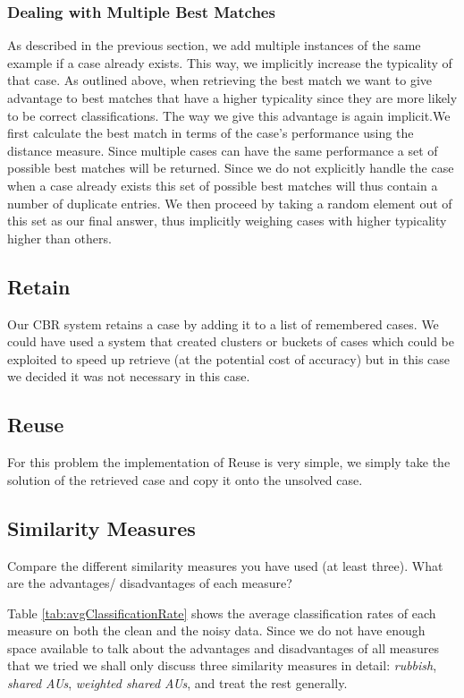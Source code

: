 \documentclass[10pt,a4paper]{article}
\begin{document}
\subsubsection{Dealing with Multiple Best Matches}
As described in the previous section, we add multiple instances of the same example if a case already exists. This way, we implicitly increase the typicality of that case. As outlined above, when retrieving the best match we want to give advantage to best matches that have a higher typicality since they are more likely to be correct classifications. The way we give this advantage is again implicit.We first calculate the best match in terms of the case's performance using the distance measure. Since multiple cases can have the same performance a set of possible best matches will be returned. Since we do not explicitly handle the case when a case already exists this set of possible best matches will thus contain a number of duplicate entries. We then proceed by taking a random element out of this set as our final answer, thus implicitly weighing cases with higher typicality higher than others.

\subsection{Retain}
Our CBR system retains a case by adding it to a list of remembered cases.
We could have used a system that created clusters or buckets of cases which could be exploited to speed up retrieve (at the potential cost of accuracy) but in this case we decided it was not necessary in this case.

\subsection{Reuse}
For this problem the implementation of Reuse is very simple, we simply take the solution of the retrieved case and copy it onto the unsolved case.

\subsection{Similarity Measures}
Compare the different similarity measures you have used (at least three). What are the advantages/ disadvantages of each measure?

Table \ref{tab:avgClassificationRate} shows the average classification rates of each measure on both the clean and the noisy data. 
Since we do not have enough space available to talk about the advantages and disadvantages of all measures that we tried we shall only discuss three similarity measures in detail: \emph{rubbish}, \emph{shared AUs}, \emph{weighted shared AUs}, and treat the rest generally.
\end{document}
